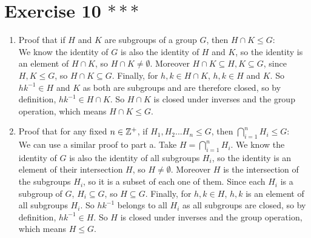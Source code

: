 \documentclass[12pt]{article}
\begin{document}
    \section*{Exercise 10 $***$}
    \begin{enumerate}[label=\textbf{\alph*.}]
        \item 
            Proof that if $H$ and $K$ are subgroups of a group $G$,
            then $H \cap K \leqslant G$: \\
            We know the identity of $G$ is also the identity of $H$ and $K$,
            so the identity is an element of $H \cap K$,
            so $H \cap K \neq \emptyset$.
            Moreover $H \cap K \subseteq H, K \subseteq G$,
            since $H, K \leqslant G$,
            so $H \cap K \subseteq G$.
            Finally, for $h, k \in H \cap K$,
            $h, k \in H$ and $K$.
            So $hk^{-1} \in H$ and $K$
            as both are subgroups and are therefore closed,
            so by definition, $hk^{-1} \in H \cap K$.
            So $H \cap K$ is closed under inverses and the group operation,
            which means $H \cap K \leqslant G$.
        \item
            Proof that for any fixed $n \in \mathbb{Z}^+$,
            if $H_1, H_2 ... H_n \leqslant G$,
            then $\bigcap_{i = 1}^n H_i \leqslant G$: \\
            We can use a similar proof to part a.
            Take $H = \bigcap_{i = 1}^n H_i$.
            We know the identity of $G$ is also the identity of all 
            subgroups $H_i$,
            so the identity is an element of their intersection $H$,
            so $H \neq \emptyset$.
            Moreover $H$ is the intersection of the subgroups $H_i$,
            so it is a subset of each one of them.
            Since each $H_i$ is a subgroup of $G$, $H_i\subseteq G$,
            so $H \subseteq G$.
            Finally, for $h, k \in H$,
            $h, k$ is an element of all subgroups $H_i$.
            So $hk^{-1}$ belongs to all $H_i$
            as all subgroups are closed,
            so by definition, $hk^{-1} \in H$.
            So $H$ is closed under inverses and the group operation,
            which means $H \leqslant G$.
    \end{enumerate}
\end{document}
